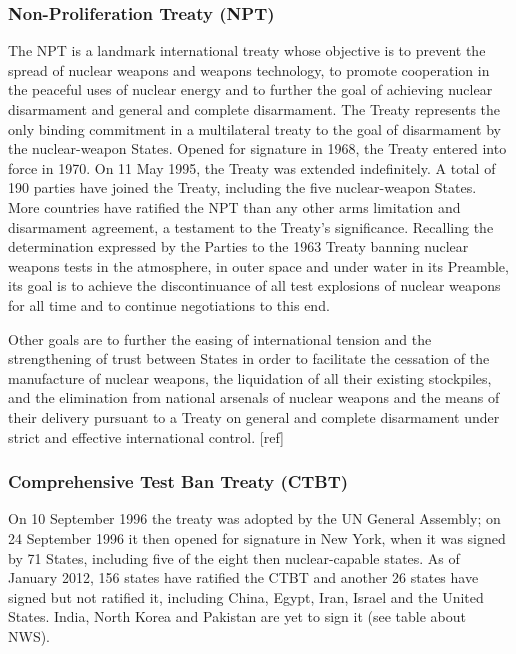 \documentclass[a4paper]{article}
\begin{document}
\subsubsection{Non-Proliferation Treaty (NPT)}
The NPT is a landmark international treaty whose objective is to prevent the 
spread of nuclear weapons and weapons technology, to promote cooperation in 
the peaceful uses of nuclear energy and to further the goal of achieving 
nuclear disarmament and general and complete disarmament. The Treaty 
represents the only binding commitment in a multilateral treaty to the goal 
of disarmament by the nuclear-weapon States. Opened for signature in 1968, 
the Treaty entered into force in 1970. On 11 May 1995, the Treaty was extended 
indefinitely. A total of 190 parties have joined the Treaty, including the 
five nuclear-weapon States. More countries have ratified the NPT than any 
other arms limitation and disarmament agreement, a testament to the Treaty's 
significance. Recalling the determination expressed by the Parties to the 1963 
Treaty banning nuclear weapons tests in the atmosphere, in outer space and 
under water in its Preamble, its goal is to achieve the discontinuance of 
all test explosions of nuclear weapons for all time and to continue 
negotiations to this end.

Other goals are to further the easing of international tension and the 
strengthening of trust between States in order to facilitate the cessation 
of the manufacture of nuclear weapons, the liquidation of all their existing 
stockpiles, and the elimination from national arsenals of nuclear weapons and 
the means of their delivery pursuant to a Treaty on general and complete 
disarmament under strict and effective international control. [ref]

\subsubsection{Comprehensive Test Ban Treaty (CTBT)}
On 10 September 1996 the treaty was adopted by the UN General Assembly; 
on 24 September 1996 it then opened for signature in New York, when it 
was signed by 71 States, including five of the eight then nuclear-capable 
states. As of January 2012, 156 states have ratified the CTBT and another 
26 states have signed but not ratified it, including China, Egypt, Iran, 
Israel and the United States. India, North Korea and Pakistan are yet to 
sign it (see table about NWS).
\end{document}
